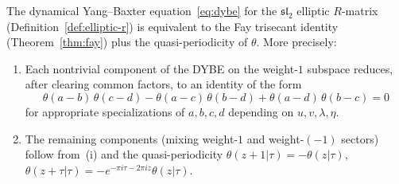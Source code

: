 \begin{proposition}
\label{prop:dybe-reduces-to-fay}
The dynamical Yang--Baxter equation~\eqref{eq:dybe}
for the $\mathfrak{sl}_2$ elliptic $R$-matrix
\textup{(}Definition~\textup{\ref{def:elliptic-r})}
is equivalent to the Fay trisecant identity
\textup{(}Theorem~\textup{\ref{thm:fay})} plus the
quasi-periodicity of $\theta$.  More precisely:
\begin{enumerate}[label=\textup{(\roman*)}]
\item Each nontrivial component of the DYBE on the
weight-$1$ subspace reduces, after clearing common
factors, to an identity of the form
\begin{equation}\label{eq:fay-applied}
\theta(a{-}b)\,\theta(c{-}d)
- \theta(a{-}c)\,\theta(b{-}d)
+ \theta(a{-}d)\,\theta(b{-}c) = 0
\end{equation}
for appropriate specializations of $a, b, c, d$ depending
on $u, v, \lambda, \eta$.
\item The remaining components (mixing weight-$1$ and
weight-$(-1)$ sectors) follow from~(i) and the
quasi-periodicity $\theta(z+1|\tau) = -\theta(z|\tau)$,
$\theta(z+\tau|\tau) = -e^{-\pi i\tau - 2\pi i z}\theta(z|\tau)$.
\end{enumerate}
\end{proposition}


